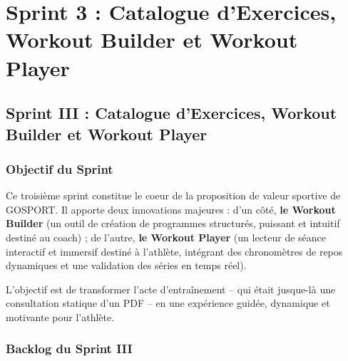 \chapter{Sprint 3 : Catalogue d'Exercices, Workout Builder et Workout Player}
\minitoc
\newpage

\section{Sprint III : Catalogue d'Exercices, Workout Builder et Workout Player}

\subsection{Objectif du Sprint}
Ce troisième sprint constitue le coeur de la proposition de valeur sportive de GOSPORT. Il apporte deux innovations majeures : d'un côté, \textbf{le Workout Builder} (un outil de création de programmes structurés, puissant et intuitif destiné au coach) ; de l'autre, \textbf{le Workout Player} (un lecteur de séance interactif et immersif destiné à l'athlète, intégrant des chronomètres de repos dynamiques et une validation des séries en temps réel).

L'objectif est de transformer l'acte d'entraînement -- qui était jusque-là une consultation statique d'un PDF -- en une expérience guidée, dynamique et motivante pour l'athlète.

\subsection{Backlog du Sprint III}

\begin{table}[H]
\centering
\renewcommand{\arraystretch}{1.4}
\caption{Backlog du Sprint 3 -- Workout Builder et Player}
\end{table}

